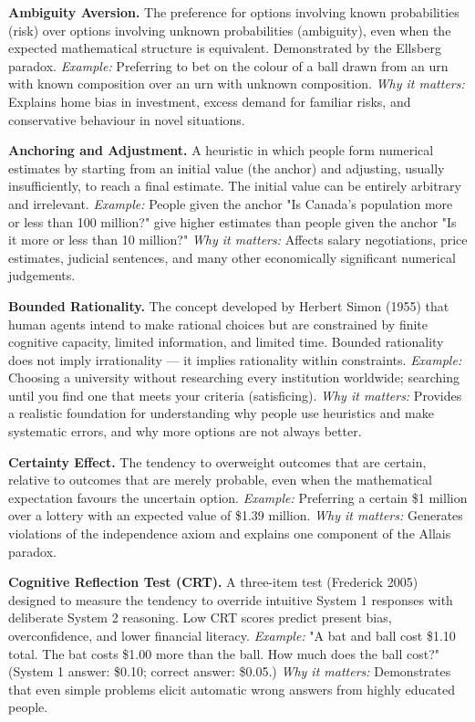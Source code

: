 \documentclass[12pt, letterpaper]{article}
\begin{document}
\textbf{Ambiguity Aversion.} The preference for options involving known probabilities (risk) over options involving unknown probabilities (ambiguity), even when the expected mathematical structure is equivalent. Demonstrated by the Ellsberg paradox. \textit{Example:} Preferring to bet on the colour of a ball drawn from an urn with known composition over an urn with unknown composition. \textit{Why it matters:} Explains home bias in investment, excess demand for familiar risks, and conservative behaviour in novel situations.

\textbf{Anchoring and Adjustment.} A heuristic in which people form numerical estimates by starting from an initial value (the anchor) and adjusting, usually insufficiently, to reach a final estimate. The initial value can be entirely arbitrary and irrelevant. \textit{Example:} People given the anchor "Is Canada's population more or less than 100 million?" give higher estimates than people given the anchor "Is it more or less than 10 million?" \textit{Why it matters:} Affects salary negotiations, price estimates, judicial sentences, and many other economically significant numerical judgements.

\textbf{Bounded Rationality.} The concept developed by Herbert Simon (1955) that human agents intend to make rational choices but are constrained by finite cognitive capacity, limited information, and limited time. Bounded rationality does not imply irrationality --- it implies rationality within constraints. \textit{Example:} Choosing a university without researching every institution worldwide; searching until you find one that meets your criteria (satisficing). \textit{Why it matters:} Provides a realistic foundation for understanding why people use heuristics and make systematic errors, and why more options are not always better.

\textbf{Certainty Effect.} The tendency to overweight outcomes that are certain, relative to outcomes that are merely probable, even when the mathematical expectation favours the uncertain option. \textit{Example:} Preferring a certain \$1 million over a lottery with an expected value of \$1.39 million. \textit{Why it matters:} Generates violations of the independence axiom and explains one component of the Allais paradox.

\textbf{Cognitive Reflection Test (CRT).} A three-item test (Frederick 2005) designed to measure the tendency to override intuitive System 1 responses with deliberate System 2 reasoning. Low CRT scores predict present bias, overconfidence, and lower financial literacy. \textit{Example:} "A bat and ball cost \$1.10 total. The bat costs \$1.00 more than the ball. How much does the ball cost?" (System 1 answer: \$0.10; correct answer: \$0.05.) \textit{Why it matters:} Demonstrates that even simple problems elicit automatic wrong answers from highly educated people.
\end{document}
